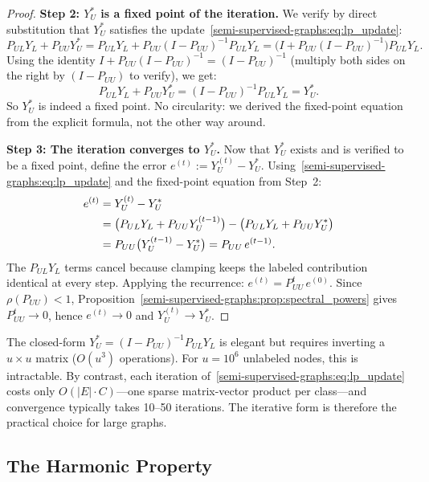 \begin{notechapter}
\begin{proof}
\textbf{Step 2: $Y_U^*$ is a fixed point of the iteration.}
We verify by direct substitution that $Y_U^*$ satisfies the
update~\eqref{semi-supervised-graphs:eq:lp_update}:
\[
  P_{UL}Y_L + P_{UU}Y_U^*
  = P_{UL}Y_L + P_{UU}(I-P_{UU})^{-1}P_{UL}Y_L
  = \bigl(I + P_{UU}(I-P_{UU})^{-1}\bigr)P_{UL}Y_L.
\]
Using the identity $I + P_{UU}(I-P_{UU})^{-1} = (I-P_{UU})^{-1}$
(multiply both sides on the right by $(I-P_{UU})$ to verify), we get:
\[
  P_{UL}Y_L + P_{UU}Y_U^* = (I-P_{UU})^{-1}P_{UL}Y_L = Y_U^*.
\]
So $Y_U^*$ is indeed a fixed point. No circularity: we derived the fixed-point
equation from the explicit formula, not the other way around.

\textbf{Step 3: The iteration converges to $Y_U^*$.}
Now that $Y_U^*$ exists and is verified to be a fixed point, define the error
$e^{(t)} := Y_U^{(t)} - Y_U^*$. Using~\eqref{semi-supervised-graphs:eq:lp_update} and the fixed-point
equation from Step~2:
\begin{align}
e^{(t)} &= Y_U^{(t)} - Y_U^* \notag\\
&= \bigl(P_{UL}Y_L + P_{UU}Y_U^{(t-1)}\bigr)
 - \bigl(P_{UL}Y_L + P_{UU}Y_U^*\bigr) \notag\\
&= P_{UU}\bigl(Y_U^{(t-1)} - Y_U^*\bigr) = P_{UU}\,e^{(t-1)}.
\end{align}
The $P_{UL}Y_L$ terms cancel because clamping keeps the labeled contribution
identical at every step. Applying the recurrence:
$e^{(t)} = P_{UU}^t\,e^{(0)}$.
Since $\rho(P_{UU}) < 1$, Proposition~\ref{semi-supervised-graphs:prop:spectral_powers} gives
$P_{UU}^t \to 0$, hence $e^{(t)} \to 0$ and $Y_U^{(t)} \to Y_U^*$.
\end{proof}

\begin{remark}
\label{semi-supervised-graphs:rem:why_iterative}
The closed-form $Y_U^* = (I - P_{UU})^{-1}P_{UL}Y_L$ is elegant but
requires inverting a $u \times u$ matrix ($O(u^3)$ operations). For
$u = 10^6$ unlabeled nodes, this is intractable. By contrast, each iteration
of~\eqref{semi-supervised-graphs:eq:lp_update} costs only $O(|E| \cdot C)$---one sparse
matrix-vector product per class---and convergence typically takes 10--50
iterations. The iterative form is therefore the practical choice for large
graphs.
\end{remark}

\subsection{The Harmonic Property}
\label{semi-supervised-graphs:subsec:harmonic}


\end{notechapter}
